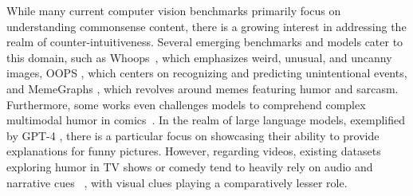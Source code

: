 While many current computer vision benchmarks primarily focus on understanding commonsense content, there is a growing interest in addressing the realm of counter-intuitiveness. Several emerging benchmarks and models cater to this domain, such as Whoops~\cite{Whoop}, which emphasizes weird, unusual, and uncanny images, OOPS \cite{Epstein_2020_CVPR}, which centers on recognizing and predicting unintentional events, and MemeGraphs \cite{kougia2023memegraphs}, which revolves around memes featuring humor and sarcasm. Furthermore, some works even challenges models to comprehend complex multimodal humor in comics~\cite{hessel2022androids}. In the realm of large language models, exemplified by GPT-4 \cite{openai2023gpt4}, there is a particular focus on showcasing their ability to provide explanations for funny pictures. However, regarding videos, existing datasets exploring humor in TV shows or comedy tend to heavily rely on audio and narrative cues ~\cite{mustard, hasan-etal-2019-ur,Patro_2021_WACV}, with visual clues playing a comparatively lesser role.





